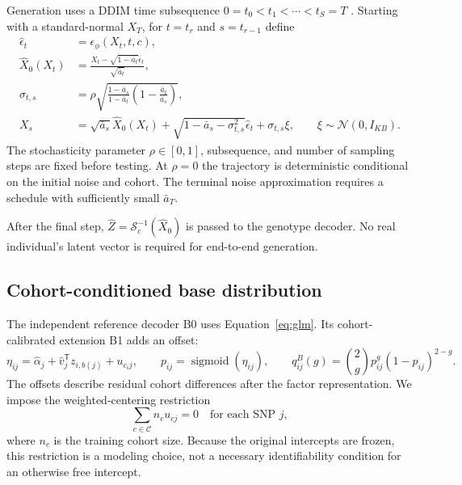 \documentclass[11pt,a4paper]{article}
\newcommand{\sigmoid}{\operatorname{sigmoid}}
\newcommand{\Normal}{\mathcal{N}}
\begin{document}
Generation uses a DDIM time subsequence
$0=t_0<t_1<\cdots<t_S=T$ \citep{Song2021}. Starting with a standard-normal
$X_T$, for $t=t_r$ and $s=t_{r-1}$ define
\begin{align}
 \widehat\epsilon_t&=\epsilon_\phi(X_t,t,c),\\
 \widehat X_0(X_t)&=
   \frac{X_t-\sqrt{1-\bar a_t}\widehat\epsilon_t}{\sqrt{\bar a_t}},\\
 \sigma_{t,s}
 &=\rho\sqrt{\frac{1-\bar a_s}{1-\bar a_t}
                    \left(1-\frac{\bar a_t}{\bar a_s}\right)},\\
 X_s&=\sqrt{\bar a_s}\widehat X_0(X_t)
       +\sqrt{1-\bar a_s-\sigma_{t,s}^2}\widehat\epsilon_t
       +\sigma_{t,s}\xi,
 \qquad \xi\sim\Normal(0,I_{KB}).
 \label{eq:ddim}
\end{align}
The stochasticity parameter $\rho\in[0,1]$, subsequence, and number of sampling
steps are fixed before testing. At $\rho=0$ the trajectory is deterministic
conditional on the initial noise and cohort. The terminal noise approximation
requires a schedule with sufficiently small $\bar a_T$.

After the final step, $\widehat Z=\mathcal S_c^{-1}(\widehat X_0)$ is passed to
the genotype decoder. No real individual's latent vector is required for
end-to-end generation.

\subsection{Cohort-conditioned base distribution}
\label{sec:base}

The independent reference decoder B0 uses Equation~\eqref{eq:glm}. Its
cohort-calibrated extension B1 adds an offset:
\begin{equation}
 \eta_{ij}=\widehat\alpha_j+
         \widehat v_j^{\mathsf T}z_{i,b(j)}+u_{c_i j},\qquad
 p_{ij}=\sigmoid(\eta_{ij}),\qquad
 q^B_{ij}(g)={2\choose g}p_{ij}^{g}(1-p_{ij})^{2-g}.
 \label{eq:base}
\end{equation}
The offsets describe residual cohort differences after the factor
representation. We impose the weighted-centering restriction
\begin{equation}
 \sum_{c\in\mathcal C}n_cu_{cj}=0\quad\text{for each SNP }j,
 \label{eq:center}
\end{equation}
where $n_c$ is the training cohort size. Because the original intercepts are
frozen, this restriction is a modeling choice, not a necessary identifiability
condition for an otherwise free intercept.
\end{document}
